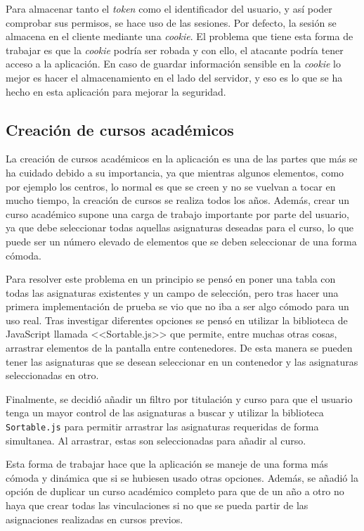 Para almacenar tanto el \textit{token} como el identificador del usuario, y así poder comprobar sus permisos, se hace uso de las sesiones.
Por defecto, la sesión se almacena en el cliente mediante una \textit{cookie}. 
El problema que tiene esta forma de trabajar es que la \textit{cookie} podría ser robada y con ello, el atacante podría tener acceso a la aplicación. 
En caso de guardar información sensible en la \textit{cookie} lo mejor es hacer el almacenamiento en el lado del servidor, y eso es lo que se ha hecho en esta aplicación para mejorar la seguridad.

\subsection{Creación de cursos académicos}
La creación de cursos académicos en la aplicación es una de las partes que más se ha cuidado debido a su importancia, ya que mientras algunos elementos, como por ejemplo los centros, lo normal es que se creen y no se vuelvan a tocar en mucho tiempo, la creación de cursos se realiza todos los años.
Además, crear un curso académico supone una carga de trabajo importante por parte del usuario, ya que debe seleccionar todas aquellas asignaturas deseadas para el curso, lo que puede ser un número elevado de elementos que se deben seleccionar de una forma cómoda.

Para resolver este problema en un principio se pensó en poner una tabla con todas las asignaturas existentes y un campo de selección, pero tras hacer una primera implementación de prueba se vio que no iba a ser algo cómodo para un uso real.
Tras investigar diferentes opciones se pensó en utilizar la biblioteca de JavaScript llamada <<Sortable.js>> que permite, entre muchas otras cosas, arrastrar elementos de la pantalla entre contenedores.
De esta manera se pueden tener las asignaturas que se desean seleccionar en un contenedor y las asignaturas seleccionadas en otro.

Finalmente, se decidió añadir un filtro por titulación y curso para que el usuario tenga un mayor control de las asignaturas a buscar y utilizar la biblioteca \texttt{Sortable.js} para permitir arrastrar las asignaturas requeridas de forma simultanea.
Al arrastrar, estas son seleccionadas para añadir al curso.

Esta forma de trabajar hace que la aplicación se maneje de una forma más cómoda y dinámica que si se hubiesen usado otras opciones.
Además, se añadió la opción de duplicar un curso académico completo para que de un año a otro no haya que crear todas las vinculaciones si no que se pueda partir de las asignaciones realizadas en cursos previos.

